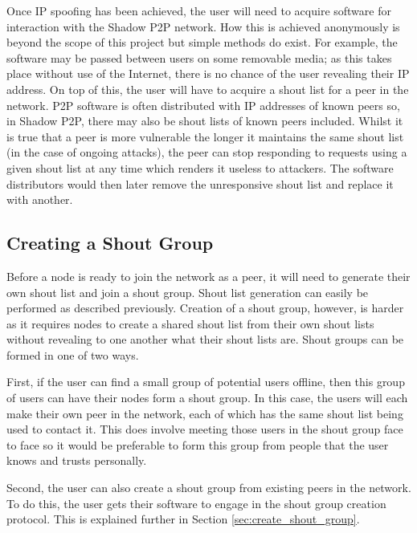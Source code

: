 \documentclass[ %
                    author={Luke Murray},
                supervisor={Dr. Simon Hollis},
                     title={Shadow Peer-to-Peer Networks},
                  subtitle={},
                    degree={MEng},
                      year={2013} ]{thesis}
\begin{document}

Once IP spoofing has been achieved, the user will need to acquire software for interaction with the Shadow P2P network. How this is achieved anonymously is beyond the scope of this project but simple methods do exist. For example, the software may be passed between users on some removable media; as this takes place without use of the Internet, there is no chance of the user revealing their IP address. On top of this, the user will have to acquire a shout list for a peer in the network. P2P software is often distributed with IP addresses of known peers so, in Shadow P2P, there may also be shout lists of known peers included. Whilst it is true that a peer is more vulnerable the longer it maintains the same shout list (in the case of ongoing attacks), the peer can stop responding to requests using a given shout list at any time which renders it useless to attackers. The software distributors would then later remove the unresponsive shout list and replace it with another. 

\subsection{Creating a Shout Group}

Before a node is ready to join the network as a peer, it will need to generate their own shout list and join a shout group. Shout list generation can easily be performed as described previously. Creation of a shout group, however, is harder as it requires nodes to create a shared shout list from their own shout lists without revealing to one another what their shout lists are. Shout groups can be formed in one of two ways.

First, if the user can find a small group of potential users offline, then this group of users can have their nodes form a shout group. In this case, the users will each make their own peer in the network, each of which has the same shout list being used to contact it. This does involve meeting those users in the shout group face to face so it would be preferable to form this group from people that the user knows and trusts personally.

Second, the user can also create a shout group from existing peers in the network. To do this, the user gets their software to engage in the shout group creation protocol. This is explained further in Section \ref{sec:create_shout_group}.
\end{document}
